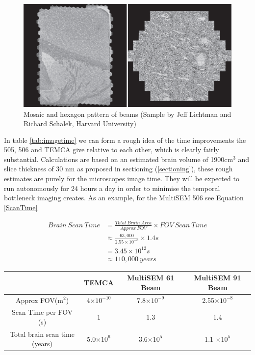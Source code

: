 \documentclass[a4paper, 11pt]{article}
\numberwithin{equation}{section}
\begin{document}
\begin{figure}[H]
	\centering
	\includegraphics[width=\textwidth]{BeamsSEM}
	
	\caption[Mosaic and hexagon pattern of beams (Sample by Jeff Lichtman and Richard Schalek, Harvard University)]{\centering \label{fig:BeamsSEM}Mosaic and hexagon pattern of beams (Sample by Jeff Lichtman and Richard Schalek, Harvard University)\protect\cite{eberle2015multiple}}
\end{figure}


In table \ref{tab:imagetime} we can form a rough idea of the time improvements the 505, 506 and TEMCA give relative to each other, which is clearly fairly substantial. Calculations are based on an estimated brain volume of 1900cm$^3$\cite{brain_size} and slice thickness of 30  nm as proposed in sectioning (\ref{sectioning}), these rough estimates are purely for the microscopes image time. They will be expected to run autonomously for 24 hours a day in order to minimise the temporal bottleneck imaging creates. As an example, for the MultiSEM 506 see Equation \ref{ScanTime} 

\begin{align}
Brain\ Scan\ Time &= \frac{Total\ Brain\ Area}{Approx\ FOV} \times FOV\ Scan\ Time\nonumber\\
&\approx \frac{63,000}{2.55\times10^{-8}}\times1.4s \nonumber\\
&= 3.45\times10^{12} s \nonumber\\
&\approx 110,000\ years
\label{ScanTime}
\end{align}
\clearpage
\begin{center}
	 \label{tab:imagetime}
	
	\begin{tabular}{ |c|c|c|c| } 
		\hline
		& TEMCA \cite{Briggman2012154}  & MultiSEM 61 Beam \cite{ZeissMulti} & MultiSEM 91 Beam\cite{ZeissMulti} \\ 
		\hline
		
		Approx FOV(m$^2$)  &  4$\times10^{-10}$     & 7.8$\times10^{-9}$         & 2.55$\times10^{-8}$      \\ 
		Scan Time per FOV (s)   & 1 & 	1.3      & 1.4      	\\ 
		Total brain scan time (years) & 	 5.0$\times10^{6}$       & 3.6$\times10^5$     & 1.1 $\times10^5$\\
		\hline	
	\end{tabular}
\end{center}
\end{document}
